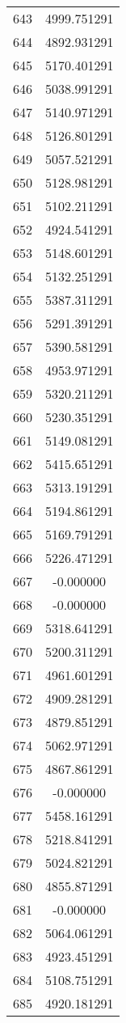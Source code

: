 \documentclass[12pt]{article}
\begin{document}
\begin{longtable}{@{}cc@{}}
643 & 4999.751291 \\
644 & 4892.931291 \\
645 & 5170.401291 \\
646 & 5038.991291 \\
647 & 5140.971291 \\
648 & 5126.801291 \\
649 & 5057.521291 \\
650 & 5128.981291 \\
651 & 5102.211291 \\
652 & 4924.541291 \\
653 & 5148.601291 \\
654 & 5132.251291 \\
655 & 5387.311291 \\
656 & 5291.391291 \\
657 & 5390.581291 \\
658 & 4953.971291 \\
659 & 5320.211291 \\
660 & 5230.351291 \\
661 & 5149.081291 \\
662 & 5415.651291 \\
663 & 5313.191291 \\
664 & 5194.861291 \\
665 & 5169.791291 \\
666 & 5226.471291 \\
667 & -0.000000 \\
668 & -0.000000 \\
669 & 5318.641291 \\
670 & 5200.311291 \\
671 & 4961.601291 \\
672 & 4909.281291 \\
673 & 4879.851291 \\
674 & 5062.971291 \\
675 & 4867.861291 \\
676 & -0.000000 \\
677 & 5458.161291 \\
678 & 5218.841291 \\
679 & 5024.821291 \\
680 & 4855.871291 \\
681 & -0.000000 \\
682 & 5064.061291 \\
683 & 4923.451291 \\
684 & 5108.751291 \\
685 & 4920.181291 \\

\end{longtable}
\end{document}
